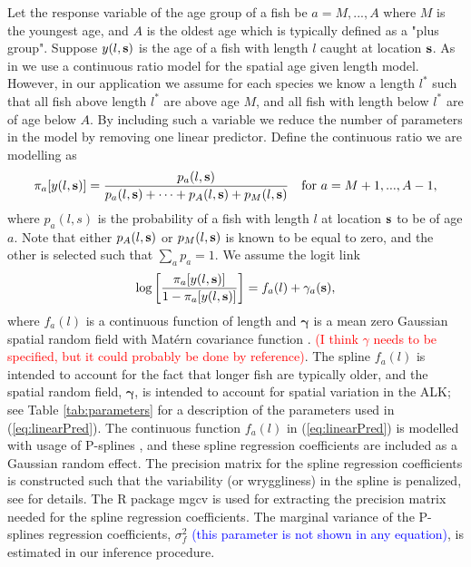 \documentclass[a4paper 12pt]{article}
\numberwithin{equation}{section}
\newcommand{\ed}[1]{\textcolor{red}{#1}}
\newcommand{\nat}[1]{\textcolor{blue}{#1}}
\begin{document}
Let the response variable of the age group of a fish be $a = M,...,A$ where $M$ is the youngest age, and $A$ is the oldest age which is typically defined as a "plus group". Suppose $y(l,{\bf s})$ is the age  of a fish with length $l$ caught at location ${\bf s}$. As in \citet{berg2012spatial} we use a continuous ratio model for the spatial age given length model. However, in our application we assume for each species we know a length $l^*$ such that all fish above length $l^*$ are above age $M$, and all fish with length below $l^*$ are of age below $A$. By including such a variable we reduce the number of parameters in the model by removing one linear predictor. Define the continuous ratio we are modelling as
\begin{equation}\label{eq:linearPred1}
\pi_a[y(l,{\bf s})] = \frac{p_a(l,{\bf s})}{p_a(l,{\bf s}) + \cdots + p_{A}(l,{\bf s}) +p_{M}(l,{\bf s}) } \vspace{ 4mm} \ \ \ \text{for } a =M+1,...,A-1 ,
\end{equation}
where \vspace{-5mm} $p_a(l,s)$ is the probability of a fish with length $l$ at location ${\bf s}$ to be of age $a$.  Note  that either $p_{A}(l,{\bf s})$ or $p_{M}(l,{\bf s})$ is known to be equal to zero, and the other is selected such that $\sum_a p_a = 1$. We assume the logit link
\begin{equation}\label{eq:linearPred}
\log \left[ \frac{\pi_a[y(l,{\bf s})]}{1-\pi_a[y(l,{\bf s})]}\right] = f_a(l) + \gamma_a({\bf s}),
\end{equation}
where $ f_a(l)$ is a continuous function of length and $\pmb{\gamma}$ is a mean zero Gaussian spatial random field with Mat\'{e}rn covariance function \citep{stein2012interpolation}. \ed{(I think $\gamma$ needs to be specified, but it could probably be done by reference)}. The spline $f_a (l)$ is intended to account for the fact that longer fish are typically older, and the spatial random field, $\pmb{\gamma}$, is intended to account for spatial variation in the ALK; see Table \ref{tab:parameters} for a description of the parameters used in (\ref{eq:linearPred}). 
 The continuous function $f_a(l)$ in (\ref{eq:linearPred}) is modelled with usage of P-splines \citep{wood2017generalized}, and these spline regression coefficients are included as a Gaussian random effect. The precision matrix for the spline regression coefficients is constructed such that the variability (or wryggliness) in the spline is penalized, see \citet[page 239]{wood2017generalized} for details. The R package mgcv \citep{wood2015package} is used for extracting the precision matrix needed for the spline regression coefficients. The marginal variance of the P-splines regression coefficients, $\sigma_f^2$ \nat{(this parameter is not shown in any equation)}, is estimated in our inference procedure. 
\end{document}
